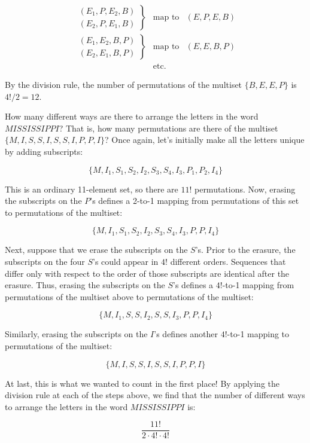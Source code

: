 \documentclass[twoside,12pt]{article}
\newcommand{\beqn}{\begin{eqnarray*}}
\newcommand{\eeqn}{\end{eqnarray*}}
\begin{document}
\beqn
\left.
\begin{array}{cc}
(E_1, P, E_2, B) \\
(E_2, P, E_1, B)
\end{array}
\right\} & \text{map to} & (E, P, E, B) \\
\left.
\begin{array}{cc}
(E_1, E_2, B, P) \\
(E_2, E_1, B, P)
\end{array}
\right\} & \text{map to} & (E, E, B, P) \\
& \text{etc.}
\eeqn

\noindent By the division rule, the number of permutations of the
multiset $\{B, E, E, P\}$ is $4! / 2 = 12$.

How many different ways are there to arrange the letters in the word
$MISSISSIPPI$?  That is, how many permutations are there of the
multiset $\{M,I,S,S,I,S,S,I,P,P,I\}$?  Once again, let's initially
make all the letters unique by adding subscripts:

\[
\{M, I_1, S_1, S_2, I_2, S_3, S_4, I_3, P_1, P_2, I_4 \}
\]

\noindent This is an ordinary 11-element set, so there are $11!$
permutations.  Now, erasing the subscripts on the $P$'s defines a
2-to-1 mapping from permutations of this set to permutations of the
multiset:

\[
\{M, I_1, S_1, S_2, I_2, S_3, S_4, I_3, P, P, I_4 \}
\]

\noindent Next, suppose that we erase the subscripts on the $S$'s.
Prior to the erasure, the subscripts on the four $S$'s could appear in
$4!$ different orders.  Sequences that differ only with respect to the
order of those subscripts are identical after the erasure.  Thus,
erasing the subscripts on the $S$'s defines a $4!$-to-1 mapping from
permutations of the multiset above to permutations of the multiset:

\[
\{M, I_1, S, S, I_2, S, S, I_3, P, P, I_4 \}
\]

\noindent Similarly, erasing the subscripts on the $I$'s defines
another $4!$-to-1 mapping to permutations of the multiset:

\[
\{M, I, S, S, I, S, S, I, P, P, I \}
\]

\noindent At last, this is what we wanted to count in the first place!
By applying the division rule at each of the steps above, we find that
the number of different ways to arrange the letters in the word
$MISSISSIPPI$ is:

\[
\frac{11!}{2 \cdot 4! \cdot 4!}
\]
\end{document}
